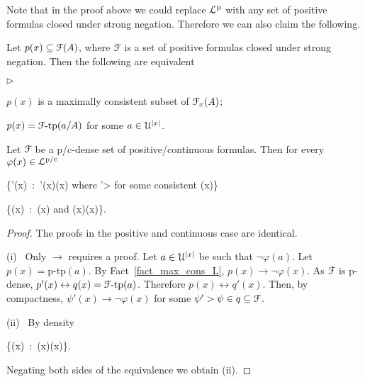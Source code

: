 \documentclass[10pt,oneside]{amsproc}
\newcommand{\mylabel}[1]{{#1}\hfill}
\renewenvironment{itemize}
  {\begin{list}{$\triangleright$}{%
  \setlength{\parskip}{0mm}
  \setlength{\topsep}{.4\baselineskip}
  \setlength{\rightmargin}{0mm}
  \setlength{\listparindent}{0mm}
  \setlength{\itemindent}{0mm}
  \setlength{\labelwidth}{3ex}
  \setlength{\itemsep}{.2\baselineskip}
  \setlength{\parsep}{.2\baselineskip}
  \setlength{\partopsep}{0mm}
  \setlength{\labelsep}{1ex}
  \setlength{\leftmargin}{\labelwidth+\labelsep}
  \let\makelabel\mylabel}}{%
\end{list}}
\begin{document}
{Note that in the proof above we could replace ${\EuScript L}^{\rm p}$ with any set of positive formulas closed under strong negation.
Therefore we can also claim the following.

\begin{fact}\label{fact_max_cons_F}
  Let $p(x)\subseteq{\EuScript F}(A)$, where ${\EuScript F}$ is a set of positive formulas closed under strong negation.
  Then the following are equivalent 
  \begin{itemize}
    \item[1.] $p(x)$ is a maximally consistent subset of ${\EuScript F}_x(A)$;
    \item[2.] $p(x)={\EuScript F}\mbox{-tp}(a/A)$ for some $a\in{\EuScript U}^{|x|}$.
  \end{itemize}
\end{fact}


\begin{proposition}\label{prop_Fapprox}
  Let ${\EuScript F}$ be a p/c-dense set of positive/continuous formulas.
  Then for every $\varphi(x)\in{\EuScript L}^{\rm p/c}$
  
  {\leftrightarrow}
  {\bigvee\big\{\psi'(x)\ :\ \psi'(x)\rightarrow\neg\varphi(x)\textrm{ where }  \psi'>\psi \textrm{ for some consistent } \psi(x)\big\}}

  {\leftrightarrow}
  {\bigvee\big\{\neg\psi(x)\ :\ \psi(x)\textrm{ and }\neg\psi(x)\rightarrow\neg\varphi(x)\big\}.}

\end{proposition}
 
\begin{proof}
  The proofs in the positive and continuous case are identical.
  
  (i) \ Only $\rightarrow$ requires a proof.
  Let $a\in {\EuScript U}^{|x|}$ be such that $\neg\varphi(a)$.
  Let $p(x)=\mbox{p-tp}(a)$.
  By Fact~\ref{fact_max_cons_L}, $p(x)\rightarrow\neg\varphi(x)$.
  As ${\EuScript F}$ is p-dense, $p'(x)\leftrightarrow q(x)={\EuScript F}\mbox{-tp}(a)$.
  Therefore $p(x)\leftrightarrow q'(x)$.
  Then, by compactness, $\psi'(x)\rightarrow\neg\varphi(x)$ for some $\psi'>\psi\in q\subseteq{\EuScript F}$.

  (ii) \ By density

  {\leftrightarrow}
  {\bigwedge\big\{\psi(x)\ :\ \varphi(x)\rightarrow\psi(x)\big\}.}
  
  Negating both sides of the equivalence we obtain (ii).
\end{proof}

}
\end{document}
